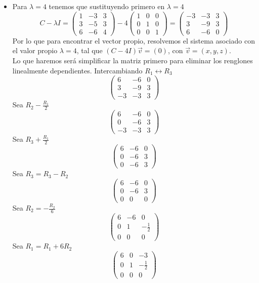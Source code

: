 \begin{itemize}
\begin{itemize}
    \item Para $\lambda=4$ tenemos que sustituyendo primero en $\lambda=4$
    $$C-\lambda I=\begin{pmatrix}1&-3&3\\ 3&-5&3\\ 6&-6&4\end{pmatrix}-4\begin{pmatrix}1&0&0\\ 0&1&0\\ 0&0&1\end{pmatrix}=\begin{pmatrix}-3&-3&3\\ 3&-9&3\\ 6&-6&0\end{pmatrix}$$
    Por lo que para encontrar el vector propio, resolvemos el sistema asociado con el valor propio $\lambda=4$, tal que $(C-4I)\vec{v}=(0)$, con $\vec{v}=(x,y,z)$.\\
    Lo que haremos ser\'a simplificar la matriz primero para eliminar los renglones linealmente dependientes.
    Intercambiando $R_1 \leftrightarrow R_3$
    $$\begin{pmatrix}6&-6&0\\ 3&-9&3\\ -3&-3&3\end{pmatrix}$$
    Sea $R_2-\frac{R_1}{2}$
    $$\begin{pmatrix}6&-6&0\\ 0&-6&3\\ -3&-3&3\end{pmatrix}$$
    Sea $R_3+\frac{R_1}{2}$
    $$\begin{pmatrix}6&-6&0\\ 0&-6&3\\ 0&-6&3\end{pmatrix}$$
    Sea $R_3=R_3-R_2$
    $$\begin{pmatrix}6&-6&0\\ 0&-6&3\\ 0&0&0\end{pmatrix}$$
    Sea $R_2=-\frac{R_2}{6}$
    $$\begin{pmatrix}6&-6&0\\ 0&1&-\frac{1}{2}\\ 0&0&0\end{pmatrix}$$
    Sea $R_1=R_1+6R_2$
    $$\begin{pmatrix}6&0&-3\\ 0&1&-\frac{1}{2}\\ 0&0&0\end{pmatrix}$$

\end{itemize}
\end{itemize}
